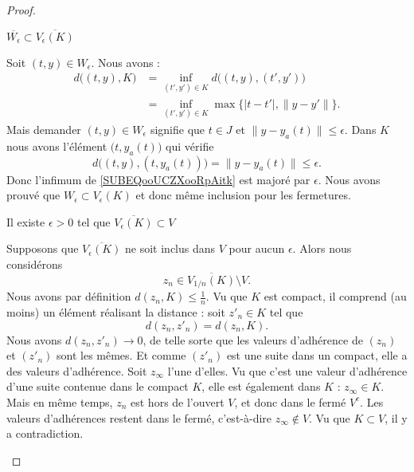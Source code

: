 \begin{proof}
    \begin{subproof}
    \item[\( \overline{ W_{\epsilon} }\subset \overline{  V_{\epsilon}(K) }\)]

        Soit \( (t,y)\in W_{\epsilon}\). Nous avons :
        \begin{subequations}
            \begin{align}
                d\big( (t,y),K \big)&=\inf_{(t',y')\in K}d\big( (t,y),(t',y') \big)\\
                &=\inf_{(t',y')\in K}\max\{ | t-t' |,\| y-y' \| \}.     \label{SUBEQooUCZXooRpAitk}
            \end{align}
        \end{subequations}
        Mais demander \( (t,y)\in W_{\epsilon}\) signifie que \( t\in J\) et \( \| y-y_a(t) \|\leq \epsilon\). Dans \( K \) nous avons l'élément \( \big( t,y_a(t) \big)\) qui vérifie
        \begin{equation}
            d\big( (t,y),(t,y_a(t)) \big)=\| y-y_a(t) \|\leq \epsilon.
        \end{equation}
        Donc l'infimum de \eqref{SUBEQooUCZXooRpAitk} est majoré par \( \epsilon\). Nous avons prouvé que \( W_{\epsilon}\subset V_{\epsilon}(K)\) et donc même inclusion pour les fermetures.

    \item[Il existe \( \epsilon>0\) tel que \( \overline{ V_{\epsilon}(K) }\subset V\)]

        Supposons que \( \overline{ V_{\epsilon}(K) }\) ne soit inclus dans \( V\) pour aucun \( \epsilon\). Alors nous considérons
        \begin{equation}
            z_n\in \overline{ V_{1/n}(K) }\setminus V.
        \end{equation}
        Nous avons par définition \( d(z_n,K)\leq \frac{1}{ n }\). Vu que \( K\) est compact, il comprend (au moins) un élément réalisant la distance : soit \( z'_n\in K\) tel que
        \begin{equation}
            d(z_n,z'_n)=d(z_n,K).
        \end{equation}
        Nous avons \( d(z_n,z'_n)\to 0\), de telle sorte que les valeurs d'adhérence de \( (z_n)\) et \( (z'_n)\) sont les mêmes. Et comme \( (z'_n)\) est une suite dans un compact, elle a des valeurs d'adhérence. Soit \( z_{\infty}\) l'une d'elles. Vu que c'est une valeur d'adhérence d'une suite contenue dans le compact \( K\), elle est également dans \( K\) : \( z_{\infty}\in K\). Mais en même temps, \( z_n\) est hors de l'ouvert \( V\), et donc dans le fermé \( V^c\). Les valeurs d'adhérences restent dans le fermé, c'est-à-dire \( z_{\infty}\notin V\). Vu que \( K\subset V\), il y a contradiction.


\end{subproof}
\end{proof}
